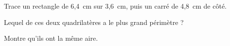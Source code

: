 \begin{myenumerate}
\item Trace un rectangle de 6,4~cm sur 3,6~cm, puis un carré de 4,8~cm de côté.
\item Lequel de ces deux quadrilatères a le plus grand périmètre ?
\item Montre qu'ils ont la même aire.
\end{myenumerate}